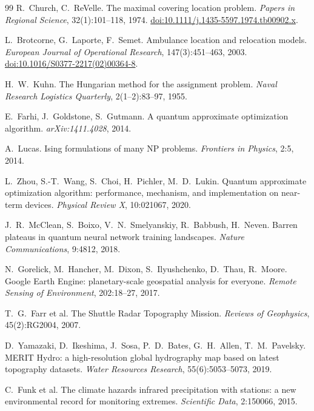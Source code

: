 \documentclass[11pt,a4paper]{article}
\begin{document}
\begin{thebibliography}{99}
R.~Church, C.~ReVelle.
The maximal covering location problem.
\emph{Papers in Regional Science}, 32(1):101--118, 1974.
\href{https://doi.org/10.1111/j.1435-5597.1974.tb00902.x}{doi:10.1111/j.1435-5597.1974.tb00902.x}.

L.~Brotcorne, G.~Laporte, F.~Semet.
Ambulance location and relocation models.
\emph{European Journal of Operational Research}, 147(3):451--463, 2003.
\href{https://doi.org/10.1016/S0377-2217(02)00364-8}{doi:10.1016/S0377-2217(02)00364-8}.

H.~W.~Kuhn.
The Hungarian method for the assignment problem.
\emph{Naval Research Logistics Quarterly}, 2(1--2):83--97, 1955.

E.~Farhi, J.~Goldstone, S.~Gutmann.
A quantum approximate optimization algorithm.
\emph{arXiv:1411.4028}, 2014.

A.~Lucas. Ising formulations of many NP problems.
\emph{Frontiers in Physics}, 2:5, 2014.

L.~Zhou, S.-T.~Wang, S.~Choi, H.~Pichler, M.~D.~Lukin.
Quantum approximate optimization algorithm: performance, mechanism, and
implementation on near-term devices.
\emph{Physical Review X}, 10:021067, 2020.

J.~R.~McClean, S.~Boixo, V.~N.~Smelyanskiy, R.~Babbush, H.~Neven.
Barren plateaus in quantum neural network training landscapes.
\emph{Nature Communications}, 9:4812, 2018.

N.~Gorelick, M.~Hancher, M.~Dixon, S.~Ilyushchenko, D.~Thau, R.~Moore.
Google Earth Engine: planetary-scale geospatial analysis for everyone.
\emph{Remote Sensing of Environment}, 202:18--27, 2017.

T.~G.~Farr et al.
The Shuttle Radar Topography Mission.
\emph{Reviews of Geophysics}, 45(2):RG2004, 2007.

D.~Yamazaki, D.~Ikeshima, J.~Sosa, P.~D.~Bates, G.~H.~Allen, T.~M.~Pavelsky.
MERIT Hydro: a high-resolution global hydrography map based on latest topography
datasets.
\emph{Water Resources Research}, 55(6):5053--5073, 2019.

C.~Funk et al.
The climate hazards infrared precipitation with stations: a new environmental
record for monitoring extremes.
\emph{Scientific Data}, 2:150066, 2015.


\end{thebibliography}
\end{document}
